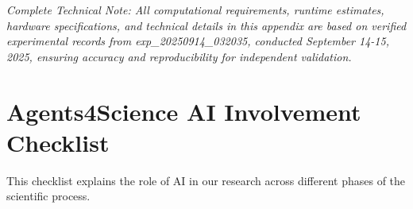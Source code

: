\documentclass{article}
\begin{document}
\textit{Complete Technical Note: All computational requirements, runtime estimates, hardware specifications, and technical details in this appendix are based on verified experimental records from exp\_20250914\_032035, conducted September 14-15, 2025, ensuring accuracy and reproducibility for independent validation.}


\newpage

\section*{Agents4Science AI Involvement Checklist}

This checklist explains the role of AI in our research across different phases of the scientific process.
\end{document}
